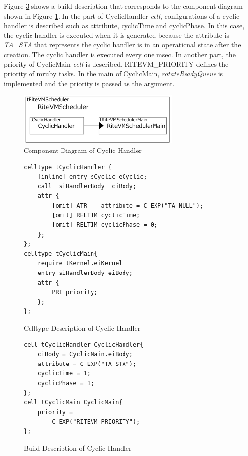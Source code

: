 \documentclass[conference,compsoc]{IEEEtran}
\begin{document}
Figure \ref{build_cyclic_handler} shows a build description that corresponds to the component diagram shown in Figure \ref{fig:cyclic_handler}.
In the part of CyclicHandler {\it cell}, configurations of a cyclic handler is described such as attribute, cyclicTime and cyclicPhase.
In this case, the cyclic handler is executed when it is generated because the attribute is {\it TA\_STA} that represents the cyclic handler is in an operational state after the creation.
The cyclic handler is executed every one msec.
In another part, the priority of CyclicMain {\it cell} is described.
RITEVM\_PRIORITY defines the priority of mruby tasks.
In the main of CyclicMain, {\it rotateReadyQueue} is implemented and the priority is passed as the argument.

\begin{figure}[t]
    \centering
    \includegraphics[width=8cm,clip]{figure/cyclic_handler.pdf}
    \caption{Component Diagram of Cyclic Handler}
    \label{fig:cyclic_handler}
\end{figure}
\begin{figure}[t]
    \centering
    \begin{lstlisting}
celltype tCyclicHandler {
    [inline] entry sCyclic eCyclic;
    call  siHandlerBody  ciBody;
    attr {
    	[omit] ATR    attribute = C_EXP("TA_NULL");
    	[omit] RELTIM cyclicTime;
    	[omit] RELTIM cyclicPhase = 0;
    };
};
celltype tCyclicMain{
    require tKernel.eiKernel;
    entry siHandlerBody eiBody;
    attr {
        PRI priority;
    };
};
    \end{lstlisting}
    \caption{Celltype Description of Cyclic Handler}
    \label{celltype_cyclic_handler}
\end{figure}
\begin{figure}[t]
    \centering
    \begin{lstlisting}
cell tCyclicHandler CyclicHandler{
    ciBody = CyclicMain.eiBody;
    attribute = C_EXP("TA_STA");
    cyclicTime = 1;
    cyclicPhase = 1;
};
cell tCyclicMain CyclicMain{
    priority =
        C_EXP("RITEVM_PRIORITY");
};
   \end{lstlisting}
    \caption{Build Description of Cyclic Handler}
    \label{build_cyclic_handler}
\end{figure}
\end{document}
